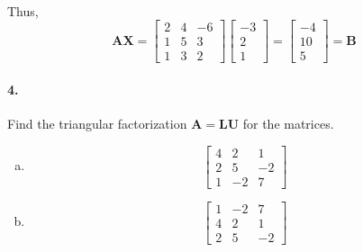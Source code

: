 \documentclass{article}  %
\begin{document}
        \paragraph{}Thus, 
        \begin{equation*}       %
            \bm{AX=} \left[                 %
              \begin{array}{rrr}   %
                2 & 4 & -6 \\
                1 & 5 & 3 \\
                1 & 3 & 2 
              \end{array}
            \right]                 %
            \left[                 %
              \begin{array}{r}   %
                -3 \\
                2 \\
                1
              \end{array}
            \right] \bm=                 %
            \left[                 %
              \begin{array}{r}   %
                -4 \\
                10 \\
                5
              \end{array}
            \right] \bm{=B}
        \end{equation*}
        \paragraph{4.}Find the triangular factorization $\bm{A = LU}$ for the matrices.
        \begin{enumerate}[(a)]
            \item \begin{equation*}       %
                \left[                 %
                  \begin{array}{rrr}   %
                    4 & 2 & 1 \\
                    2 & 5 & -2 \\
                    1 & -2 & 7
                  \end{array}
                \right]                 %
            \end{equation*}
            \item \begin{equation*}       %
                \left[                 %
                  \begin{array}{rrr}   %
                    1 & -2 & 7 \\
                    4 & 2 & 1 \\
                    2 & 5 & -2 
                  \end{array}
                \right]                 %
            \end{equation*}
        \end{enumerate}
\end{document}
